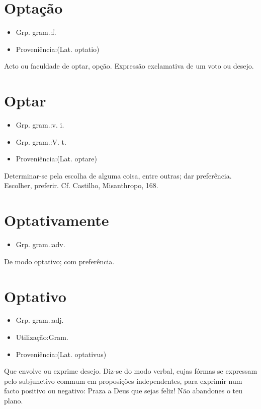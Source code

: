 \section{Optação}
\begin{itemize}
\item {Grp. gram.:f.}
\end{itemize}
\begin{itemize}
\item {Proveniência:(Lat. \textunderscore optatio\textunderscore )}
\end{itemize}
Acto ou faculdade de optar, opção.
Expressão exclamativa de um voto ou desejo.
\section{Optar}
\begin{itemize}
\item {Grp. gram.:v. i.}
\end{itemize}
\begin{itemize}
\item {Grp. gram.:V. t.}
\end{itemize}
\begin{itemize}
\item {Proveniência:(Lat. \textunderscore optare\textunderscore )}
\end{itemize}
Determinar-se pela escolha de alguma coisa, entre outras; dar preferência.
Escolher, preferir. Cf. Castilho, \textunderscore Misanthropo\textunderscore , 168.
\section{Optativamente}
\begin{itemize}
\item {Grp. gram.:adv.}
\end{itemize}
De modo optativo; com preferência.
\section{Optativo}
\begin{itemize}
\item {Grp. gram.:adj.}
\end{itemize}
\begin{itemize}
\item {Utilização:Gram.}
\end{itemize}
\begin{itemize}
\item {Proveniência:(Lat. \textunderscore optativus\textunderscore )}
\end{itemize}
Que envolve ou exprime desejo.
Diz-se do modo verbal, cujas fórmas se expressam pelo subjunctivo commum em proposições independentes, para exprimir num facto positivo ou negativo: \textunderscore Praza a Deus que sejas feliz! Não abandones o teu plano\textunderscore .
